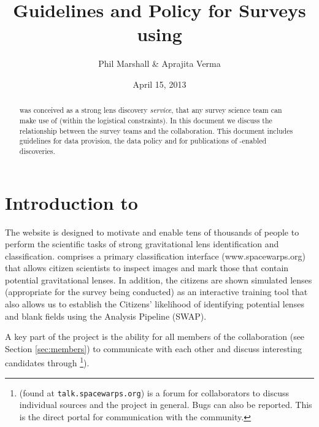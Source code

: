\documentclass[a4paper]{article}
\begin{document}
             
\title{Guidelines and Policy for Surveys using \SW}
\author{Phil Marshall \& Aprajita Verma}
\date{April 15, 2013}
\maketitle


\begin{abstract} 
\noindent \sw was conceived as a strong lens
discovery {\it service}, that any survey science team can make use of
(within the logistical constraints). In this document we discuss the relationship
between the survey teams and the \sw collaboration. 
This document includes guidelines for data provision, the data policy and for publications of \sw-enabled discoveries.
\end{abstract}

\setcounter{footnote}{0}


\section{Introduction to \sw}

The \sw website is designed to motivate and  enable tens of thousands of
people to perform the scientific tasks of strong gravitational lens
identification and classification.  \sw comprises a primary classification interface (www.spacewarps.org) that allows citizen scientists to inspect images and mark those that contain potential gravitational lenses. In addition, the citizens are shown simulated lenses (appropriate for the survey being conducted) as an interactive training tool that also allows us to establish the Citizens' likelihood of identifying potential lenses and blank fields using the \sw Analysis Pipeline (SWAP). 

A key part of the \sw project is the ability for all members of the \sw collaboration (see Section \ref{sec:members}) to communicate with each other and discuss interesting candidates through \Talk\footnote{\Talk (found at \texttt{talk.spacewarps.org}) is a forum for \sw collaborators to discuss individual sources and the \sw project in general. Bugs can also be reported. This is the direct portal for communication with the \sw community.}).



\end{document}

